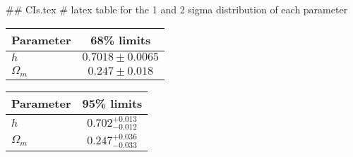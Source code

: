 ## CIs.tex
# latex table for the 1 and 2 sigma distribution of each parameter

\begin{tabular} { l  c}
 Parameter &  68\% limits\\
\hline
{\boldmath$h              $} & $0.7018\pm 0.0065          $\\
{\boldmath$\Omega_m       $} & $0.247\pm 0.018            $\\
\hline
\end{tabular}

\begin{tabular} { l  c}
 Parameter &  95\% limits\\
\hline
{\boldmath$h              $} & $0.702^{+0.013}_{-0.012}   $\\
{\boldmath$\Omega_m       $} & $0.247^{+0.036}_{-0.033}   $\\
\hline
\end{tabular}
